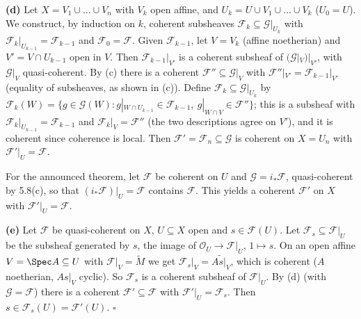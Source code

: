 \documentclass[11pt]{article}
\begin{document}
\textbf{(d)} Let $X=V_1\cup\dots\cup V_n$ with $V_k$ open affine, and $U_k=U\cup V_1\cup\dots\cup V_k$ ($U_0=U$). We construct, by induction on $k$, coherent subsheaves $\mathcal F_k\subseteq\mathcal G|_{U_k}$ with $\mathcal F_k|_{U_{k-1}}=\mathcal F_{k-1}$ and $\mathcal F_0=\mathcal F$. Given $\mathcal F_{k-1}$, let $V=V_k$ (affine noetherian) and $V'=V\cap U_{k-1}$ open in $V$. Then $\mathcal F_{k-1}|_{V'}$ is a coherent subsheaf of $(\mathcal G|_V)|_{V'}$, with $\mathcal G|_V$ quasi-coherent. By (c) there is a coherent $\mathcal F''\subseteq\mathcal G|_V$ with $\mathcal F''|_{V'}=\mathcal F_{k-1}|_{V'}$ (equality of subsheaves, as shown in (c)). Define $\mathcal F_k\subseteq\mathcal G|_{U_k}$ by $\mathcal F_k(W)=\{g\in\mathcal G(W):g|_{W\cap U_{k-1}}\in\mathcal F_{k-1},\ g|_{W\cap V}\in\mathcal F''\}$; this is a subsheaf with $\mathcal F_k|_{U_{k-1}}=\mathcal F_{k-1}$ and $\mathcal F_k|_V=\mathcal F''$ (the two descriptions agree on $V'$), and it is coherent since coherence is local. Then $\mathcal F'=\mathcal F_n\subseteq\mathcal G$ is coherent on $X=U_n$ with $\mathcal F'|_U=\mathcal F$.

For the announced theorem, let $\mathcal F$ be coherent on $U$ and $\mathcal G=i_*\mathcal F$, quasi-coherent by 5.8(c), so that $(i_*\mathcal F)|_U=\mathcal F$ contains $\mathcal F$. This yields a coherent $\mathcal F'$ on $X$ with $\mathcal F'|_U=\mathcal F$.

\textbf{(e)} Let $\mathcal F$ be quasi-coherent on $X$, $U\subseteq X$ open and $s\in\mathcal F(U)$. Let $\mathcal F_s\subseteq\mathcal F|_U$ be the subsheaf generated by $s$, the image of $\mathcal O_U\to\mathcal F|_U$, $1\mapsto s$. On an open affine $V=\Spec A\subseteq U$ with $\mathcal F|_V=\widetilde M$ we get $\mathcal F_s|_V=\widetilde{As|_V}$, which is coherent ($A$ noetherian, $As|_V$ cyclic). So $\mathcal F_s$ is a coherent subsheaf of $\mathcal F|_U$. By (d) (with $\mathcal G=\mathcal F$) there is a coherent $\mathcal F'\subseteq\mathcal F$ with $\mathcal F'|_U=\mathcal F_s$. Then $s\in\mathcal F_s(U)=\mathcal F'(U)$. \hfill$\square$
\end{document}
